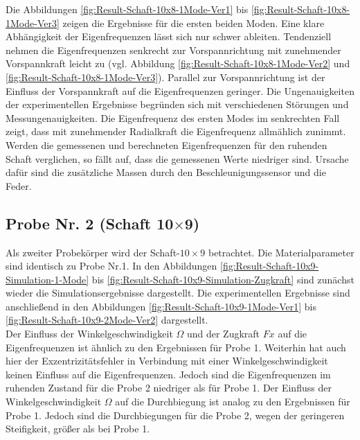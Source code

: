 	Die Abbildungen \ref{fig:Result-Schaft-10x8-1Mode-Ver1} bis \ref{fig:Result-Schaft-10x8-1Mode-Ver3} zeigen die Ergebnisse für die ersten beiden Moden. Eine klare Abhängigkeit der Eigenfrequenzen lässt sich nur schwer ableiten. Tendenziell nehmen die Eigenfrequenzen senkrecht zur Vorspannrichtung mit zunehmender Vorspannkraft leicht zu (vgl. Abbildung \ref{fig:Result-Schaft-10x8-1Mode-Ver2} und \ref{fig:Result-Schaft-10x8-1Mode-Ver3}). Parallel zur Vorspannrichtung ist der Einfluss der Vorspannkraft auf die Eigenfrequenzen geringer. Die Ungenauigkeiten der experimentellen Ergebnisse begründen sich mit verschiedenen Störungen und Messungenauigkeiten. Die Eigenfrequenz des ersten Modes im senkrechten Fall zeigt, dass mit zunehmender Radialkraft die Eigenfrequenz allmählich zunimmt. Werden die gemessenen und berechneten Eigenfrequenzen für den ruhenden Schaft verglichen, so fällt auf, dass die gemessenen Werte niedriger sind. Ursache dafür sind die zusätzliche Massen durch den Beschleunigungssensor und die Feder. 
	
	
	\subsection{Probe Nr. 2 (Schaft 10$\times$9)}	
	Als zweiter Probekörper wird der Schaft-$10\times9 $ betrachtet. Die Materialparameter sind identisch zu Probe Nr.1. In den Abbildungen \ref{fig:Result-Schaft-10x9-Simulation-1-Mode} bis \ref{fig:Result-Schaft-10x9-Simulation-Zugkraft} sind zunächst wieder die Simulationsergebnisse dargestellt. Die experimentellen Ergebnisse sind anschließend in den Abbildungen \ref{fig:Result-Schaft-10x9-1Mode-Ver1} bis \ref{fig:Result-Schaft-10x9-2Mode-Ver2} dargestellt.\\
	
	Der Einfluss der Winkelgeschwindigkeit $\Omega$ und der Zugkraft $ Fx $ auf die Eigenfrequenzen ist ähnlich zu den Ergebnissen für Probe 1. Weiterhin hat auch hier der Exzentrizitätsfehler in Verbindung mit einer Winkelgeschwindigkeit keinen Einfluss auf die Eigenfrequenzen. Jedoch sind die Eigenfrequenzen im ruhenden Zustand für die Probe 2 niedriger als für Probe 1. Der Einfluss der Winkelgeschwindigkeit $\Omega$ auf die Durchbiegung ist analog zu den Ergebnissen für Probe 1. Jedoch sind die Durchbiegungen für die Probe 2, wegen der geringeren Steifigkeit, größer als bei Probe 1. \\
	
